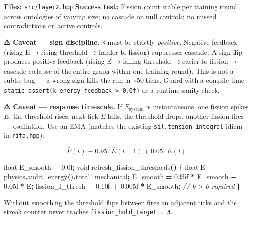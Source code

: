 \documentclass[
  11pt,
  a4paper,
]{article}
\newenvironment{Shaded}{\begin{snugshade}}{\end{snugshade}}
\newcommand{\BuiltInTok}[1]{#1}
\newcommand{\CommentTok}[1]{\textcolor[rgb]{0.56,0.35,0.01}{\textit{#1}}}
\newcommand{\DataTypeTok}[1]{\textcolor[rgb]{0.13,0.29,0.53}{#1}}
\newcommand{\FloatTok}[1]{\textcolor[rgb]{0.00,0.00,0.81}{#1}}
\newcommand{\NormalTok}[1]{#1}
\newcommand{\OperatorTok}[1]{\textcolor[rgb]{0.81,0.36,0.00}{\textbf{#1}}}
\begin{document}
\textbf{Files:} \texttt{src/layer2.hpp} \textbf{Success test:} Fission
count stable per training round across ontologies of varying size; no
cascade on null controls; no missed contradictions on active controls.

\textbf{⚠️ Caveat --- sign discipline.} \texttt{k} must be strictly
\emph{positive}. Negative feedback (rising E → rising threshold → harder
to fission) suppresses cascade. A sign flip produces positive feedback
(rising E → falling threshold → easier to fission → cascade collapse of
the entire graph within one training round). This is not a subtle bug
--- a wrong sign kills the run in \textasciitilde50 ticks. Guard with a
compile-time
\texttt{static\_assert(k\_energy\_feedback\ \textgreater{}\ 0.0f)} or a
runtime sanity check.

\textbf{⚠️ Caveat --- response timescale.} If \(E_\text{system}\) is
instantaneous, one fission spikes \(E\), the threshold rises, next tick
\(E\) falls, the threshold drops, another fission fires --- oscillation.
Use an EMA (matches the existing \texttt{sil.tension\_integral} idiom in
\texttt{rifa.hpp}):

\[
\bar{E}(t) = 0.95 \cdot \bar{E}(t-1) + 0.05 \cdot E(t)
\]

\begin{Shaded}
\begin{Highlighting}[]
\DataTypeTok{float}\NormalTok{ E\_smooth }\OperatorTok{=} \FloatTok{0.0}\BuiltInTok{f}\OperatorTok{;}
\DataTypeTok{void}\NormalTok{ refresh\_fission\_thresholds}\OperatorTok{()} \OperatorTok{\{}
    \DataTypeTok{float}\NormalTok{ E }\OperatorTok{=}\NormalTok{ physics}\OperatorTok{.}\NormalTok{audit\_energy}\OperatorTok{().}\NormalTok{total\_mechanical}\OperatorTok{;}
\NormalTok{    E\_smooth }\OperatorTok{=} \FloatTok{0.95}\BuiltInTok{f} \OperatorTok{*}\NormalTok{ E\_smooth }\OperatorTok{+} \FloatTok{0.05}\BuiltInTok{f} \OperatorTok{*}\NormalTok{ E}\OperatorTok{;}
\NormalTok{    fission\_I\_thresh }\OperatorTok{=} \FloatTok{0.10}\BuiltInTok{f} \OperatorTok{+} \FloatTok{0.005}\BuiltInTok{f} \OperatorTok{*}\NormalTok{ E\_smooth}\OperatorTok{;}   \CommentTok{// k \textgreater{} 0 required}
\OperatorTok{\}}
\end{Highlighting}
\end{Shaded}

Without smoothing the threshold flips between fires on adjacent ticks
and the streak counter never reaches
\texttt{fission\_hold\_target\ =\ 3}.

\begin{center}\rule{0.5\linewidth}{0.5pt}\end{center}
\end{document}
